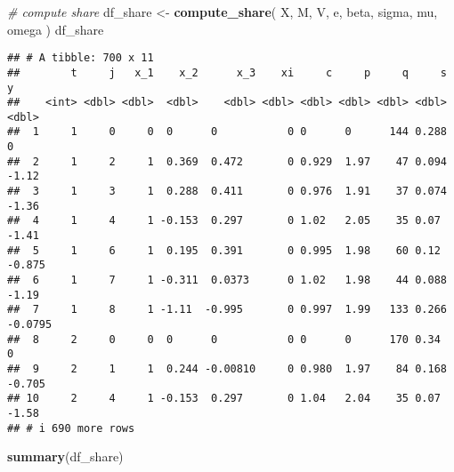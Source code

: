 \documentclass[
]{book}
\newenvironment{Shaded}{\begin{snugshade}}{\end{snugshade}}
\newcommand{\CommentTok}[1]{\textcolor[rgb]{0.56,0.35,0.01}{\textit{#1}}}
\newcommand{\FunctionTok}[1]{\textcolor[rgb]{0.13,0.29,0.53}{\textbf{#1}}}
\newcommand{\NormalTok}[1]{#1}
\newcommand{\OtherTok}[1]{\textcolor[rgb]{0.56,0.35,0.01}{#1}}
\begin{document}
\begin{Shaded}
\begin{Highlighting}[]
\CommentTok{\# compute share}
\NormalTok{df\_share }\OtherTok{\textless{}{-}}
  \FunctionTok{compute\_share}\NormalTok{(}
\NormalTok{    X, }
\NormalTok{    M, }
\NormalTok{    V, }
\NormalTok{    e, }
\NormalTok{    beta, }
\NormalTok{    sigma, }
\NormalTok{    mu, }
\NormalTok{    omega}
\NormalTok{    )}
\NormalTok{df\_share}
\end{Highlighting}
\end{Shaded}

\begin{verbatim}
## # A tibble: 700 x 11
##        t     j   x_1    x_2      x_3    xi     c     p     q     s       y
##    <int> <dbl> <dbl>  <dbl>    <dbl> <dbl> <dbl> <dbl> <dbl> <dbl>   <dbl>
##  1     1     0     0  0      0           0 0      0      144 0.288  0     
##  2     1     2     1  0.369  0.472       0 0.929  1.97    47 0.094 -1.12  
##  3     1     3     1  0.288  0.411       0 0.976  1.91    37 0.074 -1.36  
##  4     1     4     1 -0.153  0.297       0 1.02   2.05    35 0.07  -1.41  
##  5     1     6     1  0.195  0.391       0 0.995  1.98    60 0.12  -0.875 
##  6     1     7     1 -0.311  0.0373      0 1.02   1.98    44 0.088 -1.19  
##  7     1     8     1 -1.11  -0.995       0 0.997  1.99   133 0.266 -0.0795
##  8     2     0     0  0      0           0 0      0      170 0.34   0     
##  9     2     1     1  0.244 -0.00810     0 0.980  1.97    84 0.168 -0.705 
## 10     2     4     1 -0.153  0.297       0 1.04   2.04    35 0.07  -1.58  
## # i 690 more rows
\end{verbatim}

\begin{Shaded}
\begin{Highlighting}[]
\FunctionTok{summary}\NormalTok{(df\_share)}
\end{Highlighting}
\end{Shaded}
\end{document}
